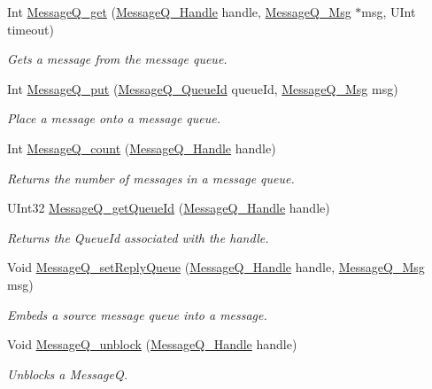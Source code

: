 \begin{DoxyCompactItemize}
Int \hyperlink{_message_q_8h_aaeb270f6b50d96f1e1dd134591ffc380}{MessageQ\_\-get} (\hyperlink{_message_q_8h_a1d584ce08733ca864d81e1e64a41cf7a}{MessageQ\_\-Handle} handle, \hyperlink{struct_message_q___msg_header}{MessageQ\_\-Msg} $\ast$msg, UInt timeout)
\begin{DoxyCompactList}\small\item\em Gets a message from the message queue. \item\end{DoxyCompactList}\item 
Int \hyperlink{_message_q_8h_aa628f9bf897924f61d6adfba3f82fa8d}{MessageQ\_\-put} (\hyperlink{_message_q_8h_a34dd32b58cf0476c2d90e3f702843297}{MessageQ\_\-QueueId} queueId, \hyperlink{struct_message_q___msg_header}{MessageQ\_\-Msg} msg)
\begin{DoxyCompactList}\small\item\em Place a message onto a message queue. \item\end{DoxyCompactList}\item 
Int \hyperlink{_message_q_8h_a5e2f02d046b2bb16dce6b41f9b4c5ad3}{MessageQ\_\-count} (\hyperlink{_message_q_8h_a1d584ce08733ca864d81e1e64a41cf7a}{MessageQ\_\-Handle} handle)
\begin{DoxyCompactList}\small\item\em Returns the number of messages in a message queue. \item\end{DoxyCompactList}\item 
UInt32 \hyperlink{_message_q_8h_af9d9030e493a5a6f961d84900e313623}{MessageQ\_\-getQueueId} (\hyperlink{_message_q_8h_a1d584ce08733ca864d81e1e64a41cf7a}{MessageQ\_\-Handle} handle)
\begin{DoxyCompactList}\small\item\em Returns the QueueId associated with the handle. \item\end{DoxyCompactList}\item 
Void \hyperlink{_message_q_8h_a2532f1ebf44ae91a8fd8f63a49e44802}{MessageQ\_\-setReplyQueue} (\hyperlink{_message_q_8h_a1d584ce08733ca864d81e1e64a41cf7a}{MessageQ\_\-Handle} handle, \hyperlink{struct_message_q___msg_header}{MessageQ\_\-Msg} msg)
\begin{DoxyCompactList}\small\item\em Embeds a source message queue into a message. \item\end{DoxyCompactList}\item 
Void \hyperlink{_message_q_8h_ae9491bc9f790e267836f27ad2e31d7de}{MessageQ\_\-unblock} (\hyperlink{_message_q_8h_a1d584ce08733ca864d81e1e64a41cf7a}{MessageQ\_\-Handle} handle)
\begin{DoxyCompactList}\small\item\em Unblocks a MessageQ. \item\end{DoxyCompactList}\end{DoxyCompactItemize}


